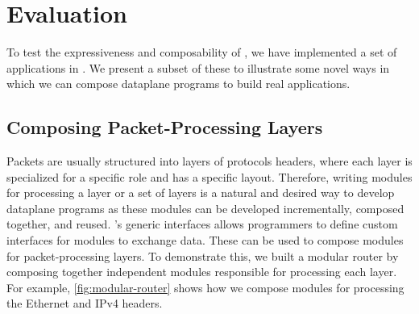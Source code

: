 \documentclass[letterpaper,twocolumn,10pt]{article}
\begin{document}
\section{Evaluation}
\label{sec:evaluation}
To test the expressiveness and composability of \ulang, we have
implemented a set of applications in \ulang. We present a subset of
these to illustrate some novel ways in which  we can compose dataplane
programs to build real applications.

\subsection{Composing Packet-Processing Layers}
\label{subsection:composing-packet-processing-layers}
Packets are usually structured into layers of protocols headers, where
each layer is specialized for a specific role and has a specific
layout. Therefore, writing modules for processing a layer or a set of
layers is a natural and desired way to develop dataplane programs as
these modules can be developed incrementally, composed together, and
reused.
\uarch's generic interfaces allows programmers to define custom
interfaces for modules to exchange data. These can be used to compose
\ulang modules for packet-processing layers. To demonstrate this, we
built a modular router by composing together independent modules
responsible for processing each layer. For example,
\cref{fig:modular-router} shows how we compose modules for processing
the Ethernet and IPv4 headers.
\end{document}
